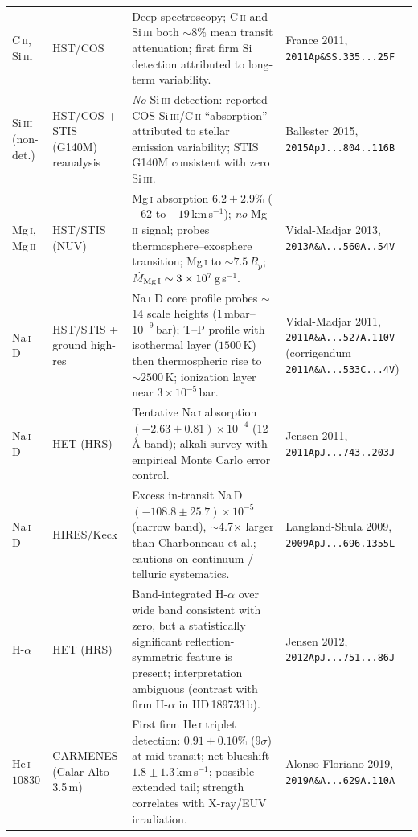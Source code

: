 \begin{longtable}{@{}p{2.3cm}p{2.9cm}p{5.7cm}p{2.6cm}@{}}
C\,\textsc{ii}, Si\,\textsc{iii} & HST/COS & Deep spectroscopy; C\,\textsc{ii} and Si\,\textsc{iii} both $\sim8\%$ mean transit attenuation; first firm Si detection attributed to long-term variability. & France 2011, \texttt{2011Ap\&SS.335...25F} \\
Si\,\textsc{iii} (non-det.) & HST/COS + STIS (G140M) reanalysis & \emph{No} Si\,\textsc{iii} detection: reported COS Si\,\textsc{iii}/C\,\textsc{ii} ``absorption'' attributed to stellar emission variability; STIS G140M consistent with zero Si\,\textsc{iii}. & Ballester 2015, \texttt{2015ApJ...804..116B} \\
Mg\,\textsc{i}, Mg\,\textsc{ii} & HST/STIS (NUV) & Mg\,\textsc{i} absorption $6.2\pm2.9\%$ ($-62$ to $-19$\,km\,s$^{-1}$); \emph{no} Mg\,\textsc{ii} signal; probes thermosphere--exosphere transition; Mg\,\textsc{i} to $\sim7.5\,R_p$; $\dot M_{\rm Mg\,I}\sim3\times10^{7}$\,g\,s$^{-1}$. & Vidal-Madjar 2013, \texttt{2013A\&A...560A..54V} \\
Na\,\textsc{i} D & HST/STIS + ground high-res & Na\,\textsc{i} D core profile probes $\sim$14 scale heights ($1$\,mbar--$10^{-9}$\,bar); T--P profile with isothermal layer ($1500$\,K) then thermospheric rise to $\sim2500$\,K; ionization layer near $3\times10^{-5}$\,bar. & Vidal-Madjar 2011, \texttt{2011A\&A...527A.110V} (corrigendum \texttt{2011A\&A...533C...4V}) \\
Na\,\textsc{i} D & HET (HRS) & Tentative Na\,\textsc{i} absorption $(-2.63\pm0.81)\times10^{-4}$ (12\,\AA{} band); alkali survey with empirical Monte Carlo error control. & Jensen 2011, \texttt{2011ApJ...743..203J} \\
Na\,\textsc{i} D & HIRES/Keck & Excess in-transit Na\,D $(-108.8\pm25.7)\times10^{-5}$ (narrow band), $\sim$4.7$\times$ larger than Charbonneau et al.; cautions on continuum / telluric systematics. & Langland-Shula 2009, \texttt{2009ApJ...696.1355L} \\
H-$\alpha$ & HET (HRS) & Band-integrated H-$\alpha$ over wide band consistent with zero, but a statistically significant reflection-symmetric feature is present; interpretation ambiguous (contrast with firm H-$\alpha$ in HD\,189733\,b). & Jensen 2012, \texttt{2012ApJ...751...86J} \\
He\,\textsc{i} $10830$ & CARMENES (Calar Alto 3.5\,m) & First firm He\,\textsc{i} triplet detection: $0.91\pm0.10\%$ ($9\sigma$) at mid-transit; net blueshift $1.8\pm1.3$\,km\,s$^{-1}$; possible extended tail; strength correlates with X-ray/EUV irradiation. & Alonso-Floriano 2019, \texttt{2019A\&A...629A.110A} \\

\end{longtable}

